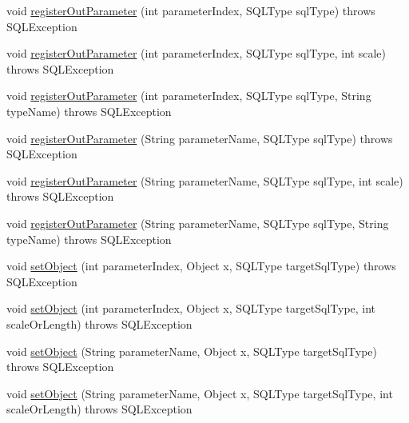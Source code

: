 \begin{DoxyCompactItemize}
\item 
void \mbox{\hyperlink{classcom_1_1mysql_1_1cj_1_1jdbc_1_1_callable_statement_wrapper_af4aee929eae36cbfce7e4117ef082022}{register\+Out\+Parameter}} (int parameter\+Index, S\+Q\+L\+Type sql\+Type)  throws S\+Q\+L\+Exception 
\item 
void \mbox{\hyperlink{classcom_1_1mysql_1_1cj_1_1jdbc_1_1_callable_statement_wrapper_afae5e49fafc4ef1689f150d9b3fd68d7}{register\+Out\+Parameter}} (int parameter\+Index, S\+Q\+L\+Type sql\+Type, int scale)  throws S\+Q\+L\+Exception 
\item 
void \mbox{\hyperlink{classcom_1_1mysql_1_1cj_1_1jdbc_1_1_callable_statement_wrapper_af76a8454598300c9faa06bcc13ca8356}{register\+Out\+Parameter}} (int parameter\+Index, S\+Q\+L\+Type sql\+Type, String type\+Name)  throws S\+Q\+L\+Exception 
\item 
void \mbox{\hyperlink{classcom_1_1mysql_1_1cj_1_1jdbc_1_1_callable_statement_wrapper_a8a349c3129cd8b7debe8235cfaf005cf}{register\+Out\+Parameter}} (String parameter\+Name, S\+Q\+L\+Type sql\+Type)  throws S\+Q\+L\+Exception 
\item 
void \mbox{\hyperlink{classcom_1_1mysql_1_1cj_1_1jdbc_1_1_callable_statement_wrapper_a3e4ad60bf29fe1256bbc49a301242e31}{register\+Out\+Parameter}} (String parameter\+Name, S\+Q\+L\+Type sql\+Type, int scale)  throws S\+Q\+L\+Exception 
\item 
void \mbox{\hyperlink{classcom_1_1mysql_1_1cj_1_1jdbc_1_1_callable_statement_wrapper_a896a5964296a43bfe85a30f9670b6164}{register\+Out\+Parameter}} (String parameter\+Name, S\+Q\+L\+Type sql\+Type, String type\+Name)  throws S\+Q\+L\+Exception 
\item 
void \mbox{\hyperlink{classcom_1_1mysql_1_1cj_1_1jdbc_1_1_callable_statement_wrapper_a8afb5f2b99f3996c750784b0b64b1400}{set\+Object}} (int parameter\+Index, Object x, S\+Q\+L\+Type target\+Sql\+Type)  throws S\+Q\+L\+Exception 
\item 
void \mbox{\hyperlink{classcom_1_1mysql_1_1cj_1_1jdbc_1_1_callable_statement_wrapper_a9ae0fd6a5dbe913227b9460cc91b7afe}{set\+Object}} (int parameter\+Index, Object x, S\+Q\+L\+Type target\+Sql\+Type, int scale\+Or\+Length)  throws S\+Q\+L\+Exception 
\item 
void \mbox{\hyperlink{classcom_1_1mysql_1_1cj_1_1jdbc_1_1_callable_statement_wrapper_a98e6163466b99b12af477410c077e3b1}{set\+Object}} (String parameter\+Name, Object x, S\+Q\+L\+Type target\+Sql\+Type)  throws S\+Q\+L\+Exception 
\item 
void \mbox{\hyperlink{classcom_1_1mysql_1_1cj_1_1jdbc_1_1_callable_statement_wrapper_a581e216a4043776d8b182adc802d93bc}{set\+Object}} (String parameter\+Name, Object x, S\+Q\+L\+Type target\+Sql\+Type, int scale\+Or\+Length)  throws S\+Q\+L\+Exception 
\end{DoxyCompactItemize}
